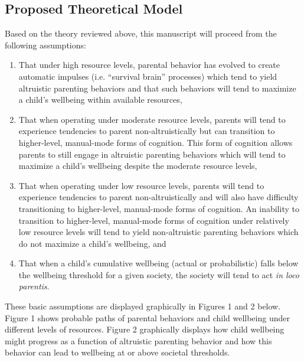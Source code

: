 \documentclass[]{elsarticle}
\begin{document}
\subsection{Proposed Theoretical
Model}\label{proposed-theoretical-model}

Based on the theory reviewed above, this manuscript will proceed from
the following assumptions:

\begin{enumerate}
\def\labelenumi{\arabic{enumi}.}
\itemsep1pt\parskip0pt
\item
  That under high resource levels, parental behavior has evolved to
  create automatic impulses (i.e. ``survival brain'' processes) which
  tend to yield altruistic parenting behaviors and that such behaviors
  will tend to maximize a child's wellbeing within available resources,
\item
  That when operating under moderate resource levels, parents will tend
  to experience tendencies to parent non-altruistically but can
  transition to higher-level, manual-mode forms of cognition. This form
  of cognition allows parents to still engage in altruistic parenting
  behaviors which will tend to maximize a child's wellbeing despite the
  moderate resource levels,
\item
  That when operating under low resource levels, parents will tend to
  experience tendencies to parent non-altruistically and will also have
  difficulty transitioning to higher-level, manual-mode forms of
  cognition. An inability to transition to higher-level, manual-mode
  forms of cognition under relatively low resource levels will tend to
  yield non-altruistic parenting behaviors which do not maximize a
  child's wellbeing, and
\item
  That when a child's cumulative wellbeing (actual or probabilistic)
  falls below the wellbeing threshold for a given society, the society
  will tend to act \emph{in loco parentis}.
\end{enumerate}

These basic assumptions are displayed graphically in Figures 1 and 2
below. Figure 1 shows probable paths of parental behaviors and child
wellbeing under different levels of resources. Figure 2 graphically
displays how child wellbeing might progress as a function of altruistic
parenting behavior and how this behavior can lead to wellbeing at or
above societal thresholds.


\end{document}

